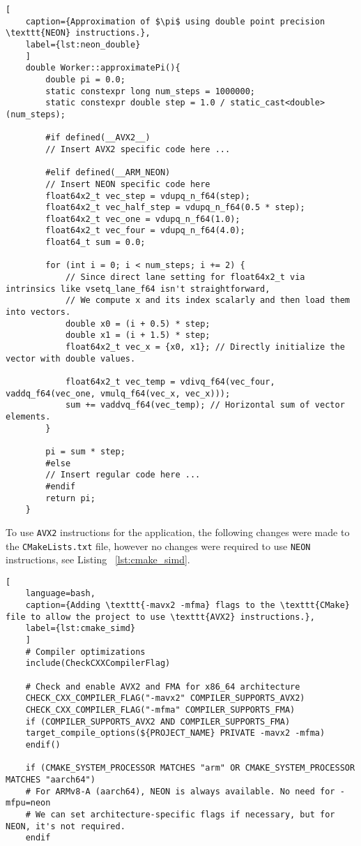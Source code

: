\begin{lstlisting}[
	caption={Approximation of $\pi$ using double point precision \texttt{NEON} instructions.},
	label={lst:neon_double}
	]
	double Worker::approximatePi(){
		double pi = 0.0;
		static constexpr long num_steps = 1000000;
		static constexpr double step = 1.0 / static_cast<double>(num_steps);
		
		#if defined(__AVX2__)
		// Insert AVX2 specific code here ...
		
		#elif defined(__ARM_NEON)
		// Insert NEON specific code here
		float64x2_t vec_step = vdupq_n_f64(step);
		float64x2_t vec_half_step = vdupq_n_f64(0.5 * step);
		float64x2_t vec_one = vdupq_n_f64(1.0);
		float64x2_t vec_four = vdupq_n_f64(4.0);
		float64_t sum = 0.0;
		
		for (int i = 0; i < num_steps; i += 2) {
			// Since direct lane setting for float64x2_t via intrinsics like vsetq_lane_f64 isn't straightforward,
			// We compute x and its index scalarly and then load them into vectors.
			double x0 = (i + 0.5) * step;
			double x1 = (i + 1.5) * step;
			float64x2_t vec_x = {x0, x1}; // Directly initialize the vector with double values.
			
			float64x2_t vec_temp = vdivq_f64(vec_four, vaddq_f64(vec_one, vmulq_f64(vec_x, vec_x)));
			sum += vaddvq_f64(vec_temp); // Horizontal sum of vector elements.
		}
		
		pi = sum * step;
		#else
		// Insert regular code here ...
		#endif
		return pi;
	}
\end{lstlisting}

To use \texttt{AVX2} instructions for the application, the following changes were made to the \texttt{CMakeLists.txt} file, however no changes were required to use \texttt{NEON} instructions, see Listing ~\ref{lst:cmake_simd}.

\begin{lstlisting}[
	language=bash,
	caption={Adding \texttt{-mavx2 -mfma} flags to the \texttt{CMake} file to allow the project to use \texttt{AVX2} instructions.},
	label={lst:cmake_simd}
	]
	# Compiler optimizations
	include(CheckCXXCompilerFlag)
	
	# Check and enable AVX2 and FMA for x86_64 architecture
	CHECK_CXX_COMPILER_FLAG("-mavx2" COMPILER_SUPPORTS_AVX2)
	CHECK_CXX_COMPILER_FLAG("-mfma" COMPILER_SUPPORTS_FMA)
	if (COMPILER_SUPPORTS_AVX2 AND COMPILER_SUPPORTS_FMA)
	target_compile_options(${PROJECT_NAME} PRIVATE -mavx2 -mfma)
	endif()
	
	if (CMAKE_SYSTEM_PROCESSOR MATCHES "arm" OR CMAKE_SYSTEM_PROCESSOR MATCHES "aarch64")
	# For ARMv8-A (aarch64), NEON is always available. No need for -mfpu=neon
	# We can set architecture-specific flags if necessary, but for NEON, it's not required.
	endif
\end{lstlisting}

